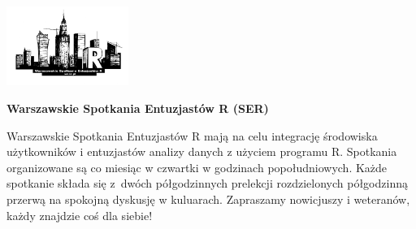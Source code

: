\documentclass[\main/boa.tex]{subfiles}
\begin{document}
	
	\begin{minipage}[t]{0.915\textwidth}
		\center     
		\includegraphics[width=150px]{img/logos.bw/ser.png} 
	\end{minipage}
	\begin{center}
	\Large \textbf {Warszawskie Spotkania Entuzjastów R (SER)}
	\end{center}
	
	\vskip 0.3cm
	\normalsize 
	Warszawskie Spotkania Entuzjastów R mają na celu integrację środowiska użytkowników i entuzjastów analizy danych z użyciem programu R. Spotkania organizowane są co miesiąc w czwartki w godzinach popołudniowych. Każde spotkanie składa się z~dwóch półgodzinnych prelekcji rozdzielonych półgodzinną przerwą na spokojną dyskusję w kuluarach. Zapraszamy nowicjuszy i weteranów, każdy znajdzie coś dla siebie!
	
	\vskip 1.5cm
\end{document}
